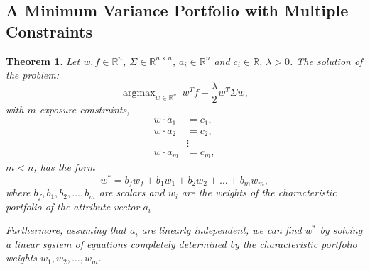 \documentclass{amsart}
\newtheorem{theorem}{Theorem}
\theoremstyle{plain}
\numberwithin{equation}{section}
\DeclareMathOperator*{\argmax}{argmax}
\begin{document}
\subsection*{A Minimum Variance Portfolio with Multiple Constraints}
\begin{theorem}
Let $w, f \in \mathbb{R}^n$, 
$\Sigma \in \mathbb{R}^{n \times n}$,
$a_i \in \mathbb{R}^{n}$ and $c_i \in \mathbb{R}$,
$\lambda > 0$.
The solution of the problem:
\begin{equation*}
\argmax_{w \in \mathbb{R}^n} ~ w^Tf - \frac{\lambda}{2} w^T \Sigma w,
\end{equation*}
with $m$ exposure constraints,
\begin{align*}
w \cdot a_1 &= c_1,\\
w \cdot a_2 &= c_2,\\
~       &\vdots ~ \\
w \cdot a_m &= c_m,
\end{align*}
$m < n$, 
has the form
\begin{equation*}
w^{*} = b_f w_f + b_1 w_1 + b_2 w_2 + \ldots + b_m w_m,
\end{equation*}
where $b_f, b_1, b_2, \ldots, b_m$ are scalars and 
$w_i$ are the weights of the characteristic portfolio of the attribute vector $a_i$. 

Furthermore, assuming that $a_i$ are 
linearly independent, we can find $w^{*}$ by 
solving a linear system of equations completely determined 
by the characteristic portfolio weights $w_1, w_2, \ldots, w_m$. 
\end{theorem}
\end{document}
